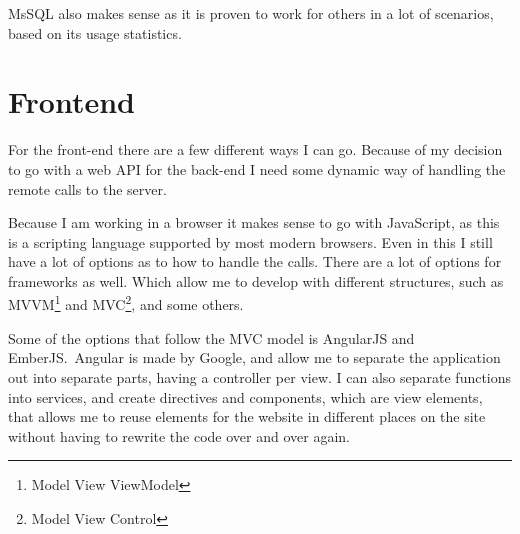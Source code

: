 MsSQL also makes sense as it is proven to work for others in a lot of scenarios,
based on its usage statistics\cite{obdms:gartner}. 

\begin{table}[h]
  \caption{Pros and cons of different types of databases}
\label{tab:sedatabse-pro-con}
\end{table}

\section{Frontend}
\label{sec:Frontend}
For the front-end there are a few different ways I can go. Because of my
decision to go with a web API for the back-end I need some dynamic way of
handling the remote calls to the server. 

Because I am working in a browser it makes sense to go with JavaScript, as this
is a scripting language supported by most modern browsers. Even in this I still
have a lot of options as to how to handle the calls. There are a lot of options
for frameworks as well. Which allow me to develop with different structures,
such as MVVM\footnote{Model View ViewModel} and MVC\footnote{Model View
  Control}, and some others. 

Some of the options that follow the MVC model is AngularJS and EmberJS.\ Angular
is made by Google\cite{angularjs}, and allow me to separate the application out
into separate parts, having a controller per view. I can also separate functions
into services, and create directives and components, which are view elements,
that allows me to reuse elements for the website in different places on the site
without having to rewrite the code over and over again. 

